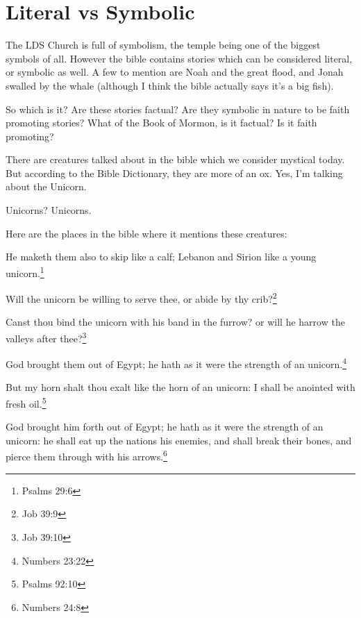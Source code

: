 \chapter{Literal vs Symbolic}

The LDS Church is full of symbolism, the temple being one of the biggest symbols of
all. However the bible contains stories which can be considered literal, or symbolic
as well. A few to mention are Noah and the great flood, and Jonah swalled by the
whale (although I think the bible actually says it's a big fish).

So which is it? Are these stories factual? Are they symbolic in nature to be faith
promoting stories? What of the Book of Mormon, is it factual? Is it faith promoting?

There are creatures talked about in the bible which we consider mystical today. But
according to the Bible Dictionary, they are more of an ox. Yes, I'm talking about the
Unicorn.

Unicorns? Unicorns.

Here are the places in the bible where it mentions these creatures:

\begin{displayquote}
He maketh them also to skip like a calf; Lebanon and Sirion like a young 
unicorn.\footnote{Psalms 29:6}
\end{displayquote}

\begin{displayquote}
Will the unicorn be willing to serve thee, or abide by thy crib?\footnote{Job 39:9}
\end{displayquote}

\begin{displayquote}
Canst thou bind the unicorn with his band in the furrow? or will he harrow the 
valleys after thee?\footnote{Job 39:10} 
\end{displayquote}

\begin{displayquote}
God brought them out of Egypt; he hath as it were the strength of an 
unicorn.\footnote{Numbers 23:22}
\end{displayquote}

\begin{displayquote}
But my horn shalt thou exalt like the horn of an unicorn: I shall be 
anointed with fresh oil.\footnote{Psalms 92:10}
\end{displayquote}

\begin{displayquote}
God brought him forth out of Egypt; he hath as it were the strength of an 
unicorn: he shall eat up the nations his enemies, and shall break their 
bones, and pierce them through with his arrows.\footnote{Numbers 24:8}
\end{displayquote}

